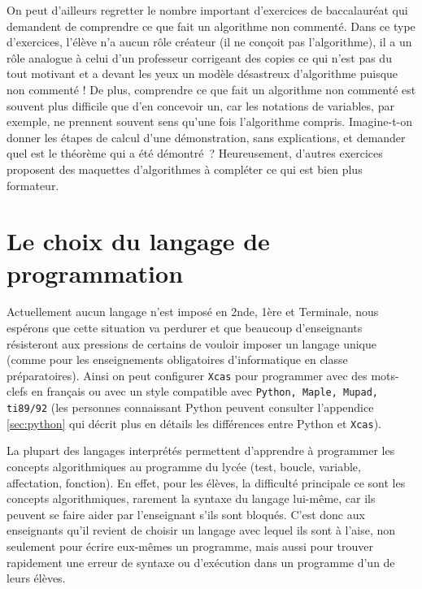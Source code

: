 \documentclass[12pt,a4paper]{book}
\begin{document}
\begin{giacjshere}
On peut d'ailleurs regretter le nombre important d'exercices de baccalaur\'eat
qui demandent de comprendre ce que fait un algorithme non comment\'e.
Dans ce type d'exercices, l'\'el\`eve n'a aucun r\^ole cr\'eateur 
(il ne con\c{c}oit pas l'algorithme), il a un r\^ole analogue \`a
celui d'un professeur corrigeant des copies ce qui n'est pas du tout
motivant et a devant les yeux un mod\`ele d\'esastreux d'algorithme puisque
non comment\'e ! 
De plus, comprendre ce que fait un algorithme non
comment\'e est souvent plus difficile que d'en concevoir un, car les
notations de variables, par exemple, ne prennent souvent sens qu'une fois
l'algorithme compris. 
Imagine-t-on donner les \'etapes de calcul
d'une d\'emonstration, sans explications, et demander quel
est le th\'eor\`eme qui a \'et\'e d\'emontr\'e~?
Heureusement, d'autres exercices proposent
des maquettes d'algorithmes \`a compl\'eter ce qui est bien plus formateur.

\section{Le choix du langage de programmation}
Actuellement aucun langage n'est impos\'e en 2nde, 1\`ere et Terminale,
nous esp\'erons que cette situation va perdurer et que beaucoup
d'enseignants r\'esisteront aux pressions de certains de vouloir imposer
un langage unique (comme pour les enseignements obligatoires
d'informatique en classe pr\'eparatoires). Ainsi on peut
configurer {\tt Xcas} pour programmer avec des mots-clefs en fran\c{c}ais ou 
avec un style compatible avec {\tt Python, Maple, Mupad, ti89/92} (les 
personnes connaissant Python peuvent consulter l'appendice \ref{sec:python} 
qui d\'ecrit plus en d\'etails les diff\'erences entre Python et {\tt Xcas}).

La plupart des langages interpr\'et\'es permettent d'apprendre \`a programmer 
les concepts algorithmiques au programme du lyc\'ee (test, boucle,
variable, affectation, fonction). En effet, pour les \'el\`eves, la difficult\'e
principale ce sont les concepts algorithmiques, rarement la syntaxe du langage 
lui-m\^eme, car ils peuvent se faire aider par l'enseignant s'ils sont 
bloqu\'es. C'est donc aux enseignants qu'il revient de choisir un langage avec 
lequel ils sont \`a l'aise, non seulement pour \'ecrire eux-m\^emes un 
programme, mais aussi pour trouver rapidement une erreur de syntaxe ou 
d'ex\'ecution dans un programme d'un de leurs \'el\`eves. 


\end{giacjshere}
\end{document}
